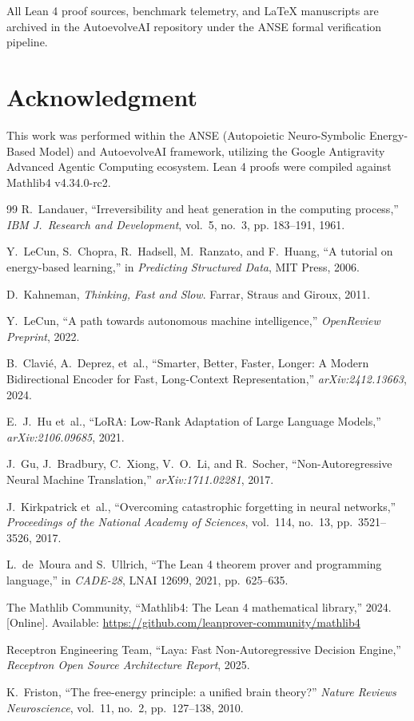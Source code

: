 \documentclass[10pt,journal,compsoc]{IEEEtran}
\theoremstyle{remark}
\begin{document}
All Lean 4 proof sources, benchmark telemetry, and LaTeX manuscripts are archived in the AutoevolveAI repository under the ANSE formal verification pipeline.

\section*{Acknowledgment}
This work was performed within the ANSE (Autopoietic Neuro-Symbolic Energy-Based Model) and AutoevolveAI framework, utilizing the Google Antigravity Advanced Agentic Computing ecosystem. Lean 4 proofs were compiled against Mathlib4 v4.34.0-rc2.

\begin{thebibliography}{99}
R.~Landauer, ``Irreversibility and heat generation in the computing process,'' \emph{IBM J.\ Research and Development}, vol.~5, no.~3, pp. 183--191, 1961.

Y.~LeCun, S.~Chopra, R.~Hadsell, M.~Ranzato, and F.~Huang, ``A tutorial on energy-based learning,'' in \emph{Predicting Structured Data}, MIT Press, 2006.

D.~Kahneman, \emph{Thinking, Fast and Slow}. Farrar, Straus and Giroux, 2011.

Y.~LeCun, ``A path towards autonomous machine intelligence,'' \emph{OpenReview Preprint}, 2022.

B.~Clavi\'{e}, A.~Deprez, et~al., ``Smarter, Better, Faster, Longer: A Modern Bidirectional Encoder for Fast, Long-Context Representation,'' \emph{arXiv:2412.13663}, 2024.

E.~J.~Hu et~al., ``LoRA: Low-Rank Adaptation of Large Language Models,'' \emph{arXiv:2106.09685}, 2021.

J.~Gu, J.~Bradbury, C.~Xiong, V.~O.~Li, and R.~Socher, ``Non-Autoregressive Neural Machine Translation,'' \emph{arXiv:1711.02281}, 2017.

J.~Kirkpatrick et~al., ``Overcoming catastrophic forgetting in neural networks,'' \emph{Proceedings of the National Academy of Sciences}, vol.~114, no.~13, pp.~3521--3526, 2017.

L.~de~Moura and S.~Ullrich, ``The Lean 4 theorem prover and programming language,'' in \emph{CADE-28}, LNAI 12699, 2021, pp.~625--635.

The Mathlib Community, ``Mathlib4: The Lean 4 mathematical library,'' 2024. [Online]. Available: \url{https://github.com/leanprover-community/mathlib4}

Receptron Engineering Team, ``Laya: Fast Non-Autoregressive Decision Engine,'' \emph{Receptron Open Source Architecture Report}, 2025.

K.~Friston, ``The free-energy principle: a unified brain theory?'' \emph{Nature Reviews Neuroscience}, vol.~11, no.~2, pp.~127--138, 2010.
\end{thebibliography}
\end{document}
